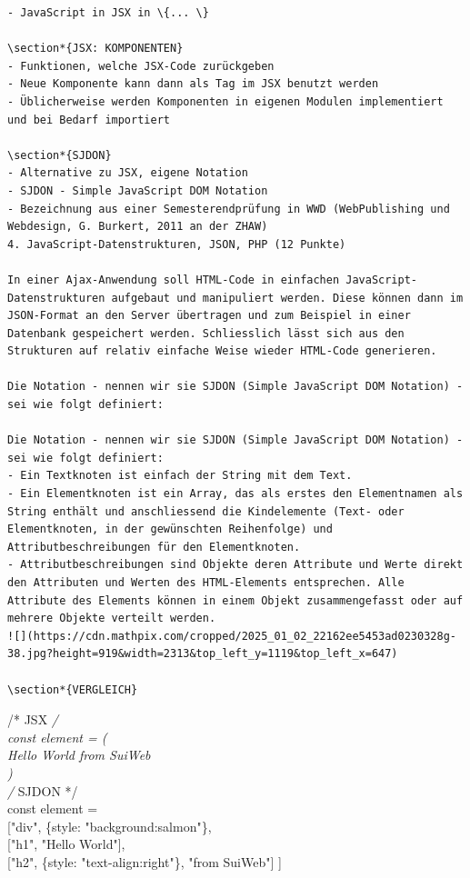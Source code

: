 \documentclass[10pt]{article}
\begin{document}
\begin{verbatim}
- JavaScript in JSX in \{... \}

\section*{JSX: KOMPONENTEN}
- Funktionen, welche JSX-Code zurückgeben
- Neue Komponente kann dann als Tag im JSX benutzt werden
- Üblicherweise werden Komponenten in eigenen Modulen implementiert und bei Bedarf importiert

\section*{SJDON}
- Alternative zu JSX, eigene Notation
- SJDON - Simple JavaScript DOM Notation
- Bezeichnung aus einer Semesterendprüfung in WWD (WebPublishing und Webdesign, G. Burkert, 2011 an der ZHAW)
4. JavaScript-Datenstrukturen, JSON, PHP (12 Punkte)

In einer Ajax-Anwendung soll HTML-Code in einfachen JavaScript-Datenstrukturen aufgebaut und manipuliert werden. Diese können dann im JSON-Format an den Server übertragen und zum Beispiel in einer Datenbank gespeichert werden. Schliesslich lässt sich aus den Strukturen auf relativ einfache Weise wieder HTML-Code generieren.

Die Notation - nennen wir sie SJDON (Simple JavaScript DOM Notation) - sei wie folgt definiert:

Die Notation - nennen wir sie SJDON (Simple JavaScript DOM Notation) - sei wie folgt definiert:
- Ein Textknoten ist einfach der String mit dem Text.
- Ein Elementknoten ist ein Array, das als erstes den Elementnamen als String enthält und anschliessend die Kindelemente (Text- oder Elementknoten, in der gewünschten Reihenfolge) und Attributbeschreibungen für den Elementknoten.
- Attributbeschreibungen sind Objekte deren Attribute und Werte direkt den Attributen und Werten des HTML-Elements entsprechen. Alle Attribute des Elements können in einem Objekt zusammengefasst oder auf mehrere Objekte verteilt werden.
![](https://cdn.mathpix.com/cropped/2025_01_02_22162ee5453ad0230328g-38.jpg?height=919&width=2313&top_left_y=1119&top_left_x=647)

\section*{VERGLEICH}
\end{verbatim}

/* JSX \textit{/\\
const element = (\\

Hello World
from SuiWeb
\\
)\\
/} SJDON */\\
const element =\\[0pt]
["div", \{style: "background:salmon"\},\\[0pt]
["h1", "Hello World"],\\[0pt]
["h2", \{style: "text-align:right"\}, "from SuiWeb"] ]
\end{document}
